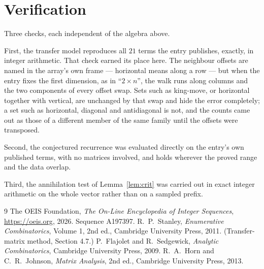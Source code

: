\documentclass[11pt,a4paper]{article}
\theoremstyle{plain}
\theoremstyle{definition}
\begin{document}
\section{Verification}

Three checks, each independent of the algebra above.

First, the transfer model reproduces all $21$ terms the entry publishes, exactly, in
integer arithmetic. That check earned its place here. The neighbour offsets are named in the
array's own frame --- horizontal means along a row --- but when the entry fixes the first
dimension, as in ``$2\times n$'', the walk runs along columns and the two components of every
offset swap. Sets such as king-move, or horizontal together with vertical, are unchanged by
that swap and hide the error completely; a set such as horizontal, diagonal and antidiagonal
is not, and the counts came out as those of a different member of the same family until the
offsets were transposed.

Second, the conjectured recurrence was evaluated directly on the entry's own published terms,
with no matrices involved, and holds wherever the proved range and the data overlap.

Third, the annihilation test of Lemma~\ref{lem:crit} was carried out in exact integer
arithmetic on the whole vector rather than on a sampled prefix.

\begin{thebibliography}{9}
 The OEIS Foundation, \emph{The On-Line Encyclopedia of Integer
Sequences}, \url{https://oeis.org}, 2026. Sequence A197397.
 R.~P.~Stanley, \emph{Enumerative Combinatorics}, Volume 1, 2nd ed.,
Cambridge University Press, 2011. (Transfer-matrix method, Section 4.7.)
 P.~Flajolet and R.~Sedgewick, \emph{Analytic Combinatorics}, Cambridge
University Press, 2009.
 R.~A.~Horn and C.~R.~Johnson, \emph{Matrix Analysis}, 2nd ed., Cambridge
University Press, 2013.
\end{thebibliography}
\end{document}
